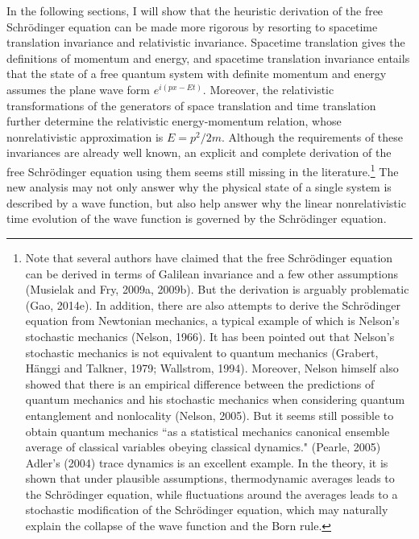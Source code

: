 In the following sections, I will show that the heuristic derivation of the free Schr\"{o}dinger equation can be made more rigorous by resorting to spacetime translation invariance and relativistic invariance.
Spacetime translation gives the definitions of momentum and energy, and spacetime translation invariance entails that the state of a free quantum system with definite momentum and energy assumes the plane wave form $e^{i(px-Et)}$. Moreover, the relativistic transformations of the generators of space translation and time translation further determine the relativistic energy-momentum relation, whose nonrelativistic approximation is $E=p^2/2m$. 
Although the requirements of these invariances are already well known, an explicit and complete derivation of the free Schr\"{o}dinger equation using them seems still missing in the literature.\footnote{Note that several authors have claimed that the free Schr\"{o}dinger equation can be derived in terms of Galilean invariance and a few other assumptions (Musielak and Fry, 2009a, 2009b). But the derivation is arguably problematic (Gao, 2014e). In addition, there are also attempts to derive the Schr\"{o}dinger equation from Newtonian mechanics, a typical example of which is Nelson's stochastic mechanics (Nelson, 1966). It has been pointed out that Nelson's stochastic mechanics is not equivalent to quantum mechanics (Grabert, H\"{a}nggi and Talkner, 1979; Wallstrom, 1994). Moreover, Nelson himself also showed that there is an empirical difference between the predictions of quantum mechanics and his stochastic mechanics when considering quantum entanglement and nonlocality (Nelson, 2005). But it seems still possible to obtain quantum mechanics ``as a statistical mechanics canonical ensemble average of classical variables obeying classical dynamics." (Pearle, 2005)  Adler's (2004) trace dynamics is an excellent example. In the theory, it is shown that under plausible assumptions, thermodynamic averages leads to the Schr\"{o}dinger equation, while fluctuations around the averages leads to a stochastic modification of the Schr\"{o}dinger equation, which may naturally explain the collapse of the wave function and the Born rule.} 
The new analysis may not only answer why the physical state of a single system is described by a wave function, but also help answer why the linear nonrelativistic time evolution of the wave function is governed by the  Schr\"{o}dinger equation. 

